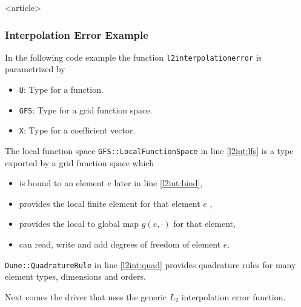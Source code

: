 \begin{frame}<article>
\frametitle<presentation>{Interpolation Error Example}
In the following code example the
function \lstinline{l2interpolationerror} is parametrized by
\begin{itemize}
\item \lstinline{U}: Type for a function. 
\item \lstinline{GFS}: Type for a grid function space.
\item \lstinline{X}: Type for a coefficient vector.
\end{itemize}
The local function space
\lstinline{GFS::LocalFunctionSpace} in line \ref{l2int:lfs} is a type 
exported by a grid function space which
\begin{itemize}
\item is bound to an element $e$ later in line \ref{l2int:bind},
\item provides the local finite element for that element $e$ ,
\item provides the local to global map $g(e,\cdot)$ for that element,
\item can read, write and add degrees of freedom of element $e$.
\end{itemize}
\lstinline{Dune::QuadratureRule} in line \ref{l2int:quad} provides
quadrature rules for many element types, dimensions and orders.
\end{frame}

%

Next comes the driver that uses the generic $L_2$ interpolation error
function.

%

